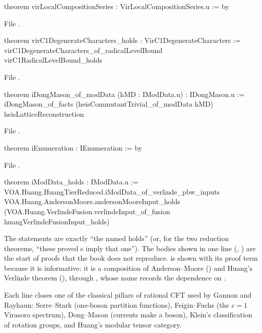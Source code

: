 \begin{leancode}
theorem virLocalCompositionSeries : VirLocalCompositionSeries.{u} := by
\end{leancode}
\noindent File .
\begin{leancode}
theorem virC1DegenerateCharacters_holds : VirC1DegenerateCharacters :=
  virC1DegenerateCharacters_of_radicalLevelBound virC1RadicalLevelBound_holds
\end{leancode}
\noindent File .
\begin{leancode}
theorem iDongMason_of_modData (hMD : IModData.{u}) : IDongMason.{u} :=
  iDongMason_of_facts (heisCommutantTrivial_of_modData hMD) heisLatticeReconstruction
\end{leancode}
\noindent File .
\begin{leancode}
theorem iEnumeration : IEnumeration := by
\end{leancode}
\noindent File .
\begin{leancode}
theorem iModData_holds : IModData.{u} :=
  VOA.Huang.HuangTierReduced.iModData_of_verlinde_pbw_inputs
    VOA.Huang.AndersonMoore.andersonMooreInput_holds
    (VOA.Huang.VerlindeFusion.verlindeInput_of_fusion huangVerlindeFusionInput_holds)
\end{leancode}

\begin{dictionary}
The statements are exactly ``the named  holds'' (or, for the two reduction theorems, ``these proved
s imply that one''). The bodies shown in one line (, ) are the start of proofs that
the book does not reproduce.  is shown with its proof term because it is informative: it is a
composition of Anderson--Moore () and Huang's Verlinde theorem
(), through , whose name records the
dependence on .
\end{dictionary}

\begin{physics}
Each line closes one of the classical pillars of rational CFT used by Gannon and Rayhaun: Serre--Stark (one-boson
partition functions), Feigin--Fuchs (the $c=1$ Virasoro spectrum), Dong--Mason (currents make a boson), Klein's
classification of rotation groups, and Huang's modular tensor category.
\end{physics}

